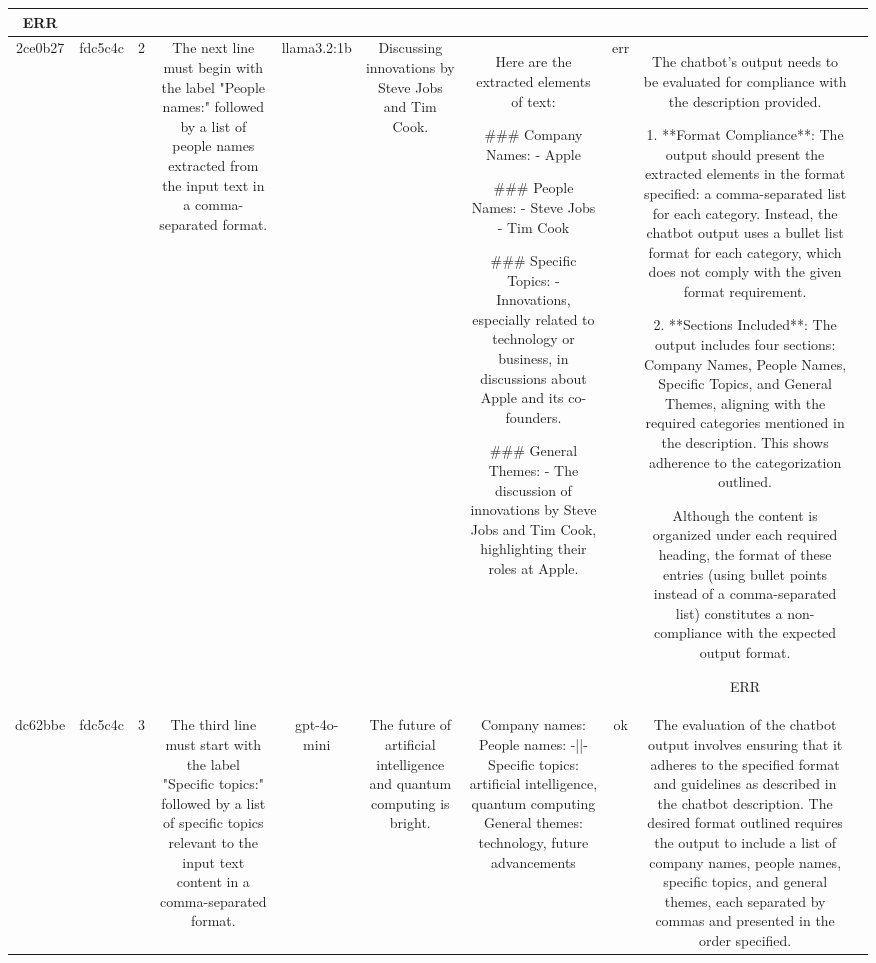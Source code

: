 \begin{table}[h!]
\begin{tabular}{|c|c|c|c|c|c|c|c|c|c|}
ERR & \\
\hline
2ce0b27 & fdc5c4c & 2 & The next line must begin with the label "People names:" followed by a list of people names extracted from the input text in a comma-separated format. & llama3.2:1b & Discussing innovations by Steve Jobs and Tim Cook. & Here are the extracted elements of text:

### Company Names:
- Apple

### People Names:
- Steve Jobs
- Tim Cook

### Specific Topics:
- Innovations, especially related to technology or business, in discussions about Apple and its co-founders.

### General Themes:
- The discussion of innovations by Steve Jobs and Tim Cook, highlighting their roles at Apple. & err & The chatbot's output needs to be evaluated for compliance with the description provided.

1. **Format Compliance**: The output should present the extracted elements in the format specified: a comma-separated list for each category. Instead, the chatbot output uses a bullet list format for each category, which does not comply with the given format requirement.

2. **Sections Included**: The output includes four sections: Company Names, People Names, Specific Topics, and General Themes, aligning with the required categories mentioned in the description. This shows adherence to the categorization outlined.

Although the content is organized under each required heading, the format of these entries (using bullet points instead of a comma-separated list) constitutes a non-compliance with the expected output format.

ERR & \\
\hline
dc62bbe & fdc5c4c & 3 & The third line must start with the label "Specific topics:" followed by a list of specific topics relevant to the input text content in a comma-separated format. & gpt-4o-mini & The future of artificial intelligence and quantum computing is bright. & Company names: 
People names: -||-
Specific topics: artificial intelligence, quantum computing
General themes: technology, future advancements & ok & The evaluation of the chatbot output involves ensuring that it adheres to the specified format and guidelines as described in the chatbot description. The desired format outlined requires the output to include a list of company names, people names, specific topics, and general themes, each separated by commas and presented in the order specified.


\end{tabular}
\end{table}

